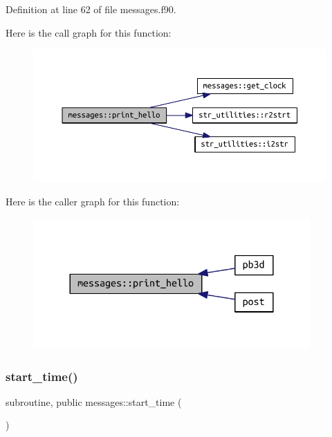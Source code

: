 Definition at line 62 of file messages.\+f90.

Here is the call graph for this function\+:
\nopagebreak
\begin{figure}[H]
\begin{center}
\leavevmode
\includegraphics[width=350pt]{namespacemessages_afb11646c8cb3655bdfc2f9c039851c0c_cgraph}
\end{center}
\end{figure}
Here is the caller graph for this function\+:
\nopagebreak
\begin{figure}[H]
\begin{center}
\leavevmode
\includegraphics[width=300pt]{namespacemessages_afb11646c8cb3655bdfc2f9c039851c0c_icgraph}
\end{center}
\end{figure}
\mbox{\label{namespacemessages_ad997c3dff64c512e0070ce8816c28e7f}} 
\subsubsection{\texorpdfstring{start\+\_\+time()}{start\_time()}}
{\footnotesize\ttfamily subroutine, public messages\+::start\+\_\+time (\begin{DoxyParamCaption}{ }\end{DoxyParamCaption})}




